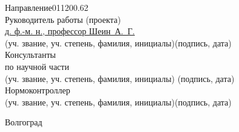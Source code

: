 \begin{titlepage}
\begin{flushleft}
		Направление\hspace{1cm}011200.62\\
		Руководитель работы (проекта)\\
		\underline{д. ф.-м. н., профессор Шеин~А.~Г.}\hfill\underline{\hspace{5cm}}\\
		\vspace{-.2cm}\hspace{.4cm}\footnotesize(уч. звание, уч. степень, 
			фамилия, инициалы)\hspace{6.5cm}(подпись, дата)\normalsize\\
		Консультанты\\
		по научной части \underline{\hspace{7cm}}\hfill%
			\underline{\hspace{5cm}}\\\vspace{-.2cm}\hspace{4cm}%
			\footnotesize(уч. звание, уч. степень, фамилия, инициалы)%
			\hspace{3cm}(подпись, дата)\normalsize\\
		Нормоконтроллер \underline{\hspace{7cm}}
			\hfill\underline{\hspace{5cm}}\\
		\vspace{-.2cm}\hspace{4cm}\footnotesize(уч. звание, уч. степень, 
			фамилия, инициалы)\hspace{3cm}(подпись, дата)\normalsize\\
	\end{flushleft}

	\vspace{\fill}

	\begin{center}
		Волгоград \the\year
	\end{center}
\end{titlepage}

